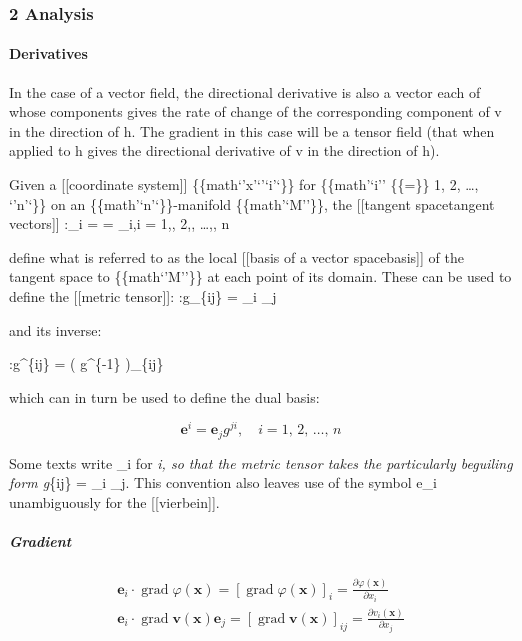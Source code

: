 \hypertarget{analysis}{%
\subsubsection{2 Analysis}\label{analysis}}

\hypertarget{derivatives}{%
\paragraph{Derivatives}\label{derivatives}}

In the case of a vector field, the directional derivative is also a
vector each of whose components gives the rate of change of the
corresponding component of v in the direction of h. The gradient in this
case will be a tensor field (that when applied to h gives the
directional derivative of v in the direction of h).

Given a {[}{[}coordinate system{]}{]} \{\{math\textbar{}`'x'`'`i'`\}\}
for \{\{math\textbar{}'`i'' \{\{=\}\} 1, 2, \ldots, `'n'`\}\} on an
\{\{math\textbar{}'`n'`\}\}-manifold \{\{math\textbar{}'`M''\}\}, the
{[}{[}tangent space\textbar tangent vectors{]}{]} :\_i =
 = \partial\_i,\quad i = 1,, 2,, \dots,, n

define what is referred to as the local {[}{[}basis of a vector
space\textbar basis{]}{]} of the tangent space to
\{\{math\textbar{}`'M''\}\} at each point of its domain. These can be
used to define the {[}{[}metric tensor{]}{]}: :g\_\{ij\} = \_i
\cdot {}\_j

and its inverse:

:g\^{}\{ij\} = \left( g\^{}\{-1\} \right)\_\{ij\}

which can in turn be used to define the dual basis:

\[\mathbf{e}^i = \mathbf{e}_j g^{ji},\quad i = 1,\, 2,\, \dots,\, n\]

Some texts write \_i for \emph{i, so that the metric
tensor takes the particularly beguiling form g}\{ij\} = \_i
\cdot {}\_j. This convention also leaves use of the symbol e\_i
unambiguously for the {[}{[}vierbein{]}{]}.

\hypertarget{gradient}{%
\subparagraph{Gradient}\label{gradient}}

\[ \begin{array}{c}{\mathbf{e}_{i} \cdot \operatorname{grad} \varphi(\mathbf{x})=[\operatorname{grad} \varphi(\mathbf{x})]_{i}=\frac{\partial \varphi(\mathbf{x})}{\partial x_{i}}}\\{\mathbf{e}_{i} \cdot \operatorname{grad} \mathbf{v}(\mathbf{x}) \mathbf{e}_{j}=[\operatorname{grad} \mathbf{v}(\mathbf{x})]_{i j}=\frac{\partial v_{i}(\mathbf{x})}{\partial x_{j}}}\end{array}\]

